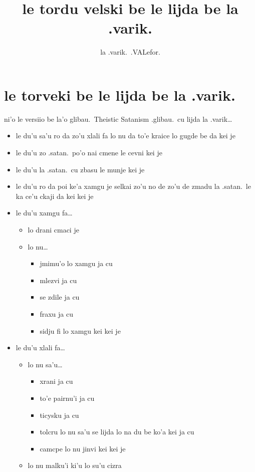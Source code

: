 \documentclass{article}
\title{le tordu velski be le lijda be la .varik.}
\author{la .varik.\ .VALefor.}
\begin{document}
\maketitle

\section{le torveki be le lijda be la .varik.}

ni'o le versiio be la'o glibau.\ Theistic Satanism .glibau.\ cu lijda la .varik\ldots

\begin{itemize}
	\item le du'u sa'u ro da zo'u xlali fa lo nu da to'e kraice lo gugde be da kei je
	\item le du'u zo .satan.\ po'o nai cmene le cevni kei je
	\item le du'u la .satan.\ cu zbasu le munje kei je
	\item le du'u ro da poi ke'a xamgu je selkai zo'u no de zo'u de zmadu la .satan.\ le ka ce'u ckaji da kei kei je
	\item le du'u xamgu fa\ldots{}
	\begin{itemize}
		\item lo drani cmaci je
		\item lo nu\ldots{}
		\begin{itemize}
			\item jmimu'o lo xamgu ja cu
			\item mlezvi ja cu
			\item se zdile ja cu
			\item fraxu ja cu
			\item sidju fi lo xamgu kei kei je
		\end{itemize}
	\end{itemize}
	\item le du'u xlali fa\ldots{}
	\begin{itemize}
		\item lo nu sa'u\ldots{}
		\begin{itemize}
			\item xrani ja cu
			\item to'e pairnu'i ja cu
			\item ticysku ja cu
			\item tolcru lo nu sa'u se lijda lo na du be ko'a kei ja cu
			\item camcpe lo nu jinvi kei kei je
		\end{itemize}
                \item lo nu malku'i ki'u lo su'u cizra
	\end{itemize}
\end{itemize}
\end{document}
